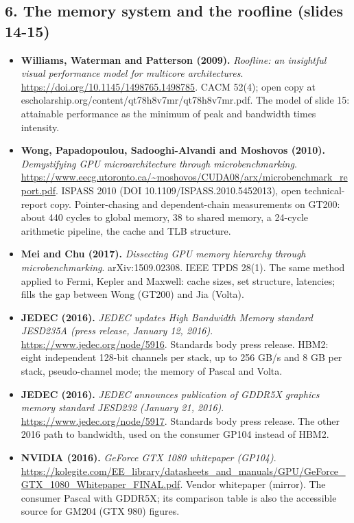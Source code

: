 \subsection*{6. The memory system and the roofline (slides 14-15)}
\begin{itemize}[leftmargin=1.2em,itemsep=3pt]\sloppy
\item \textbf{Williams, Waterman and Patterson (2009).} \textit{Roofline: an insightful visual performance model for multicore architectures}. \url{https://doi.org/10.1145/1498765.1498785}. CACM 52(4); open copy at escholarship.org/content/qt78h8v7mr/qt78h8v7mr.pdf. The model of slide 15: attainable performance as the minimum of peak and bandwidth times intensity.
\item \textbf{Wong, Papadopoulou, Sadooghi-Alvandi and Moshovos (2010).} \textit{Demystifying GPU microarchitecture through microbenchmarking}. \url{https://www.eecg.utoronto.ca/~moshovos/CUDA08/arx/microbenchmark_report.pdf}. ISPASS 2010 (DOI 10.1109/ISPASS.2010.5452013), open technical-report copy. Pointer-chasing and dependent-chain measurements on GT200: about 440 cycles to global memory, 38 to shared memory, a 24-cycle arithmetic pipeline, the cache and TLB structure.
\item \textbf{Mei and Chu (2017).} \textit{Dissecting GPU memory hierarchy through microbenchmarking}. arXiv:1509.02308. IEEE TPDS 28(1). The same method applied to Fermi, Kepler and Maxwell: cache sizes, set structure, latencies; fills the gap between Wong (GT200) and Jia (Volta).
\item \textbf{JEDEC (2016).} \textit{JEDEC updates High Bandwidth Memory standard JESD235A (press release, January 12, 2016)}. \url{https://www.jedec.org/node/5916}. Standards body press release. HBM2: eight independent 128-bit channels per stack, up to 256 GB/s and 8 GB per stack, pseudo-channel mode; the memory of Pascal and Volta.
\item \textbf{JEDEC (2016).} \textit{JEDEC announces publication of GDDR5X graphics memory standard JESD232 (January 21, 2016)}. \url{https://www.jedec.org/node/5917}. Standards body press release. The other 2016 path to bandwidth, used on the consumer GP104 instead of HBM2.
\item \textbf{NVIDIA (2016).} \textit{GeForce GTX 1080 whitepaper (GP104)}. \url{https://kolegite.com/EE_library/datasheets_and_manuals/GPU/GeForce_GTX_1080_Whitepaper_FINAL.pdf}. Vendor whitepaper (mirror). The consumer Pascal with GDDR5X; its comparison table is also the accessible source for GM204 (GTX 980) figures.
\end{itemize}
